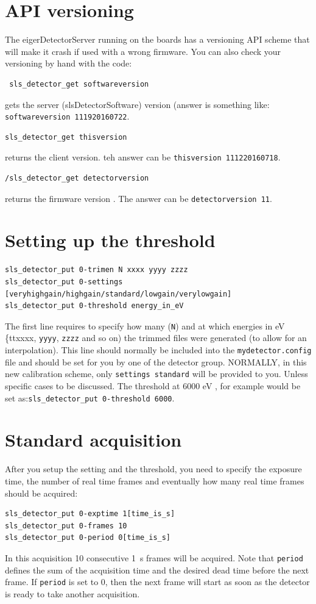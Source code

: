 \documentclass{article}
\begin{document}
\section{API versioning}
The eigerDetectorServer running on the boards has a versioning API scheme that will make it crash if used with a wrong firmware.
You can also check your versioning by hand with the code:
\begin{verbatim}
 sls_detector_get softwareversion
\end{verbatim}
gets the server (slsDetectorSoftware) version (answer is something like: {\tt{softwareversion 111920160722}}.
 \begin{verbatim}
sls_detector_get thisversion 
\end{verbatim}
returns the client version. teh answer can be {\tt{thisversion 111220160718}}.
\begin{verbatim}
/sls_detector_get detectorversion
\end{verbatim}
returns the firmware version . The answer can be {\tt{detectorversion 11}}.

\section{Setting up the threshold}
\begin{verbatim}
sls_detector_put 0-trimen N xxxx yyyy zzzz
sls_detector_put 0-settings [veryhighgain/highgain/standard/lowgain/verylowgain]
sls_detector_put 0-threshold energy_in_eV
\end{verbatim}
The first line requires to specify how many ({\tt{N}}) and at which energies in eV {\{tt{xxxx}}, {\tt{yyyy}}, {\tt{zzzz}} and so on) the trimmed files were generated (to allow for an interpolation). This line should normally be included into the {\tt{mydetector.config}} file and should be set for you by one of the detector group.
NORMALLY, in this new calibration scheme, only {\tt{settings standard}} will be provided to you. Unless specific cases to be discussed.
The threshold at 6000 eV , for example would be set as:{\tt{sls\_detector\_put 0-threshold 6000}}.

\section{Standard acquisition}

After you setup the setting and the threshold, you need to specify the exposure time, the number of real time frames and eventually how many real time frames should be acquired:
\begin{verbatim}
sls_detector_put 0-exptime 1[time_is_s]
sls_detector_put 0-frames 10
sls_detector_put 0-period 0[time_is_s]
\end{verbatim}
In this acquisition 10 consecutive 1~s frames will be acquired. Note that {\tt{period}} defines the sum of the acquisition time and the desired dead time before the next frame. If {\tt{period}} is set to 0, then the next frame will start as soon as the detector is ready to take another acquisition. \\
\end{document}
